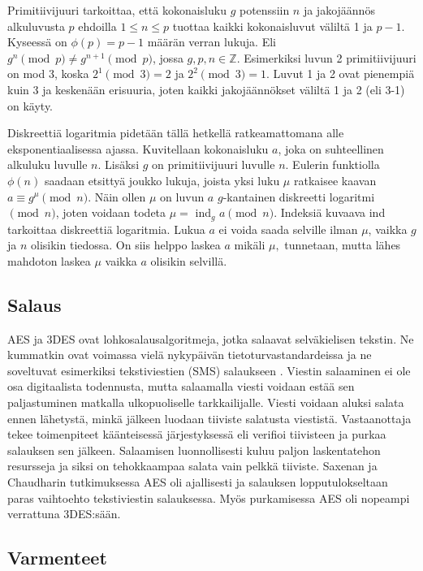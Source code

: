 \documentclass[finnish]{tktltiki2}
\theoremstyle{definition}
\theoremstyle{remark}
\begin{document}
Primitiivijuuri tarkoittaa, että kokonaisluku $g$ potenssiin $n$ ja jakojäännös alkuluvusta $p$ ehdoilla $1 \leq n \leq p$ tuottaa kaikki kokonaisluvut väliltä 1 ja $p-1$. Kyseessä on $\phi(p) = p - 1$ määrän verran lukuja. Eli $g^n \pmod{p} \neq g^{n+1} \pmod{p}$, jossa $g, p, n \in \mathbb{Z}$. Esimerkiksi luvun 2 primitiivijuuri on mod 3, koska $2^1 \pmod{3} = 2$ ja $2^2 \pmod{3} = 1$. Luvut 1 ja 2 ovat pienempiä kuin 3 ja keskenään erisuuria, joten kaikki jakojäännökset väliltä 1 ja 2 (eli 3-1) on käyty. \cite{prim}

Diskreettiä logaritmia pidetään tällä hetkellä ratkeamattomana alle eksponentiaalisessa ajassa. Kuvitellaan kokonaisluku $a$, joka on suhteellinen alkuluku luvulle $n$. Lisäksi $g$ on primitiivijuuri luvulle $n$. Eulerin funktiolla $\phi(n)$ saadaan etsittyä joukko lukuja, joista yksi luku $\mu$ ratkaisee kaavan  $a \equiv g^{\mu} \pmod{n}$. Näin ollen $\mu$ on luvun $a$ $g$-kantainen diskreetti logaritmi $\pmod{n}$, joten voidaan todeta $\mu = $ ind$_g$ $a\pmod{n}$. Indeksiä kuvaava ind tarkoittaa diskreettiä logaritmia. Lukua $a$ ei voida saada selville ilman $\mu$, vaikka $g$ ja $n$ olisikin tiedossa. On siis helppo laskea $a$ mikäli $\mu, $ tunnetaan, mutta lähes mahdoton laskea $\mu$ vaikka $a$ olisikin selvillä. \cite{disc}

\subsection{Salaus} 

AES ja 3DES ovat lohkosalausalgoritmeja, jotka salaavat selväkielisen tekstin. Ne kummatkin ovat voimassa vielä nykypäivän tietoturvastandardeissa ja ne soveltuvat esimerkiksi tekstiviestien (SMS) salaukseen \cite{gsm}. Viestin salaaminen ei ole osa digitaalista todennusta, mutta salaamalla viesti voidaan estää sen paljastuminen matkalla ulkopuoliselle tarkkailijalle. Viesti voidaan aluksi salata ennen lähetystä, minkä jälkeen luodaan tiiviste salatusta viestistä. Vastaanottaja tekee toimenpiteet käänteisessä järjestyksessä eli verifioi tiivisteen ja purkaa salauksen sen jälkeen. Salaamisen luonnollisesti kuluu paljon laskentatehon resursseja ja siksi on tehokkaampaa salata vain pelkkä tiiviste. Saxenan ja Chaudharin \cite{gsm} tutkimuksessa AES oli ajallisesti ja salauksen lopputulokseltaan paras vaihtoehto tekstiviestin salauksessa. Myös purkamisessa AES oli nopeampi verrattuna 3DES:sään. 

\subsection{Varmenteet}
\end{document}
